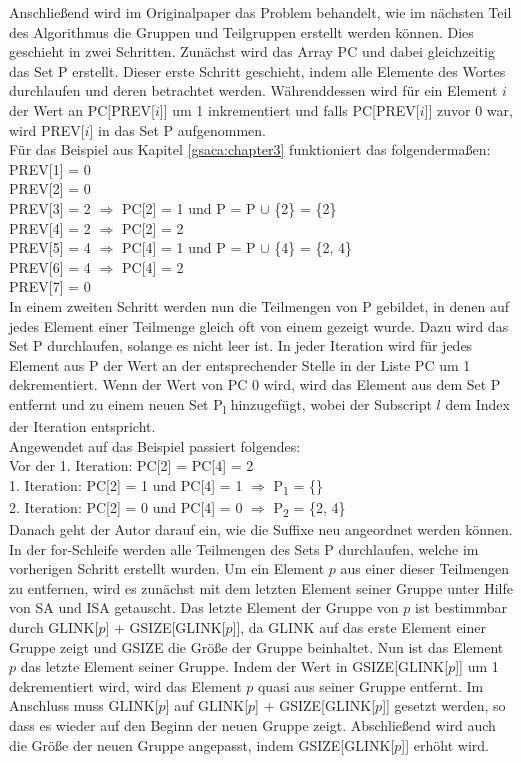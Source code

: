Anschließend wird im Originalpaper das Problem behandelt, wie im nächsten Teil des Algorithmus die Gruppen und Teilgruppen erstellt werden können. 
Dies geschieht in zwei Schritten. 
Zunächst wird das Array PC und dabei gleichzeitig das Set P erstellt. 
Dieser erste Schritt geschieht, indem alle Elemente des Wortes durchlaufen und deren \prevpointer betrachtet werden. 
Währenddessen wird für ein Element $i$ der Wert an PC[PREV[$i$]] um 1 inkrementiert und falls PC[PREV[$i$]] zuvor 0 war, wird PREV[$i$] in das Set P aufgenommen.\\
Für das Beispiel aus Kapitel \ref{gsaca:chapter3} funktioniert das folgendermaßen:\\
PREV[1] = 0\\
PREV[2] = 0\\
PREV[3] = 2 $\Rightarrow$ PC[2] = 1 und P = P $\cup$ \{2\} = \{2\}\\
PREV[4] = 2 $\Rightarrow$ PC[2] = 2\\
PREV[5] = 4 $\Rightarrow$ PC[4] = 1 und P = P $\cup$ \{4\} = \{2, 4\}\\
PREV[6] = 4 $\Rightarrow$ PC[4] = 2\\
PREV[7] = 0\\
In einem zweiten Schritt werden nun die Teilmengen von P gebildet, in denen auf jedes Element einer Teilmenge gleich oft von einem \prevpointer gezeigt wurde. 
Dazu wird das Set P durchlaufen, solange es nicht leer ist. 
In jeder Iteration wird für jedes Element aus P der Wert an der entsprechender Stelle in der Liste PC um 1 dekrementiert. 
Wenn der Wert von PC 0 wird, wird das Element aus dem Set P entfernt und zu einem neuen Set P\textsubscript{l} hinzugefügt, wobei der Subscript $l$ dem Index der Iteration entspricht. \\
Angewendet auf das Beispiel passiert folgendes:\\
Vor der 1. Iteration: PC[2] = PC[4] = 2\\
1. Iteration: PC[2] = 1 und PC[4] = 1 $\Rightarrow$ P\textsubscript{1} = \{\} \\
2. Iteration: PC[2] = 0 und PC[4] = 0 $\Rightarrow$ P\textsubscript{2} = \{2, 4\}\\

Danach geht der Autor darauf ein, wie die Suffixe neu angeordnet werden können. 
In der for-Schleife werden alle Teilmengen des Sets P durchlaufen, welche im vorherigen Schritt erstellt wurden. 
Um ein Element $p$ aus einer dieser Teilmengen zu entfernen, wird es zunächst mit dem letzten Element seiner Gruppe unter Hilfe von SA und ISA getauscht. 
Das letzte Element der Gruppe von $p$ ist bestimmbar durch GLINK[$p$] + GSIZE[GLINK[$p$]], da GLINK auf das erste Element einer Gruppe zeigt und GSIZE die Größe der Gruppe beinhaltet. 
Nun ist das Element $p$ das letzte Element seiner Gruppe. 
Indem der Wert in GSIZE[GLINK[$p$]] um 1 dekrementiert wird, wird das Element $p$ quasi aus seiner Gruppe entfernt. 
Im Anschluss muss GLINK[$p$] auf GLINK[$p$] + GSIZE[GLINK[$p$]] gesetzt werden, so dass es wieder auf den Beginn der neuen Gruppe zeigt. 
Abschließend wird auch die Größe der neuen Gruppe angepasst, indem GSIZE[GLINK[$p$]] erhöht wird.\\

